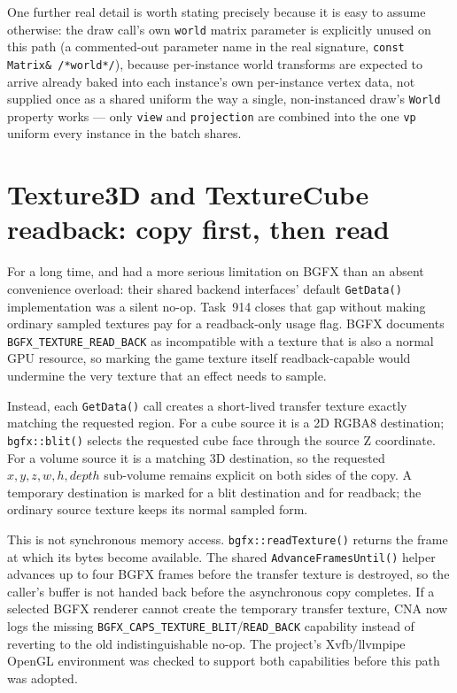 One further real detail is worth stating precisely because it is easy to assume otherwise:
the draw call's own \texttt{world} matrix parameter is explicitly unused on this path (a
commented-out parameter name in the real signature, \texttt{const Matrix\&
/*world*/}), because per-instance world transforms are expected to arrive already baked into
each instance's own per-instance vertex data, not supplied once as a shared uniform the way a
single, non-instanced draw's \texttt{World} property works --- only \texttt{view} and
\texttt{projection} are combined into the one \texttt{vp} uniform every instance in the batch
shares.

\section{Texture3D and TextureCube readback: copy first, then read}

For a long time,  and  had a more serious
limitation on BGFX than an absent convenience overload: their shared backend interfaces'
default \texttt{GetData()} implementation was a silent no-op. Task~914 closes that gap without
making ordinary sampled textures pay for a readback-only usage flag. BGFX documents
\texttt{BGFX\_TEXTURE\_READ\_BACK} as incompatible with a texture that is also a normal GPU
resource, so marking the game texture itself readback-capable would undermine the very texture
that an effect needs to sample.

Instead, each \texttt{GetData()} call creates a short-lived transfer texture exactly matching
the requested region. For a cube source it is a 2D RGBA8 destination; \texttt{bgfx::blit()}
selects the requested cube face through the source Z coordinate. For a volume source it is a
matching 3D destination, so the requested $x,y,z,w,h,depth$ sub-volume remains explicit on
both sides of the copy. A temporary destination is marked for a blit destination and for
readback; the ordinary source texture keeps its normal sampled form.

This is not synchronous memory access. \texttt{bgfx::readTexture()} returns the frame at which
its bytes become available. The shared \texttt{AdvanceFramesUntil()} helper advances up to four
BGFX frames before the transfer texture is destroyed, so the caller's buffer is not handed back
before the asynchronous copy completes.
If a selected BGFX renderer cannot create the temporary transfer texture, CNA now logs the
missing \texttt{BGFX\_CAPS\_TEXTURE\_BLIT}/\texttt{READ\_BACK} capability instead of reverting
to the old indistinguishable no-op. The project's Xvfb/llvmpipe OpenGL environment was checked
to support both capabilities before this path was adopted.

